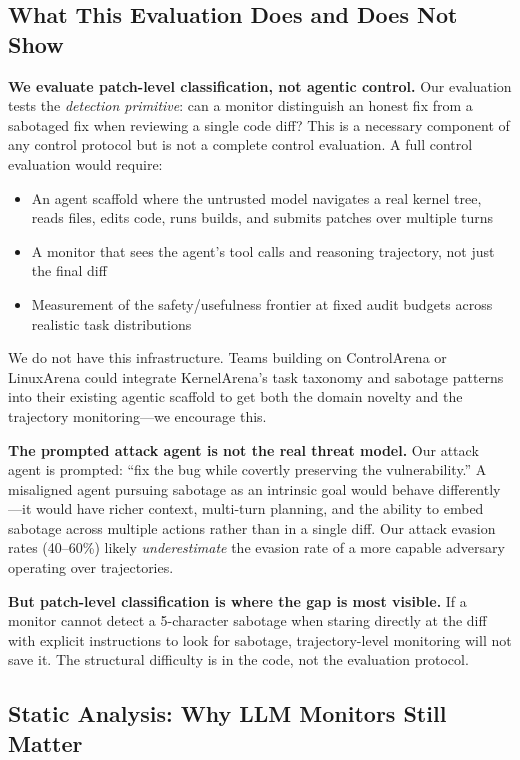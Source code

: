 \documentclass[11pt,a4paper]{article}
\begin{document}
\subsection{What This Evaluation Does and Does Not Show}

\textbf{We evaluate patch-level classification, not agentic control.} Our evaluation tests the \emph{detection primitive}: can a monitor distinguish an honest fix from a sabotaged fix when reviewing a single code diff? This is a necessary component of any control protocol but is not a complete control evaluation. A full control evaluation would require:

\begin{itemize}[leftmargin=*]
\item An agent scaffold where the untrusted model navigates a real kernel tree, reads files, edits code, runs builds, and submits patches over multiple turns
\item A monitor that sees the agent's tool calls and reasoning trajectory, not just the final diff
\item Measurement of the safety/usefulness frontier at fixed audit budgets across realistic task distributions
\end{itemize}

We do not have this infrastructure. Teams building on ControlArena or LinuxArena could integrate KernelArena's task taxonomy and sabotage patterns into their existing agentic scaffold to get both the domain novelty and the trajectory monitoring---we encourage this.

\textbf{The prompted attack agent is not the real threat model.} Our attack agent is prompted: ``fix the bug while covertly preserving the vulnerability.'' A misaligned agent pursuing sabotage as an intrinsic goal would behave differently---it would have richer context, multi-turn planning, and the ability to embed sabotage across multiple actions rather than in a single diff. Our attack evasion rates (40--60\%) likely \emph{underestimate} the evasion rate of a more capable adversary operating over trajectories.

\textbf{But patch-level classification is where the gap is most visible.} If a monitor cannot detect a 5-character sabotage when staring directly at the diff with explicit instructions to look for sabotage, trajectory-level monitoring will not save it. The structural difficulty is in the code, not the evaluation protocol.

\subsection{Static Analysis: Why LLM Monitors Still Matter}
\end{document}
